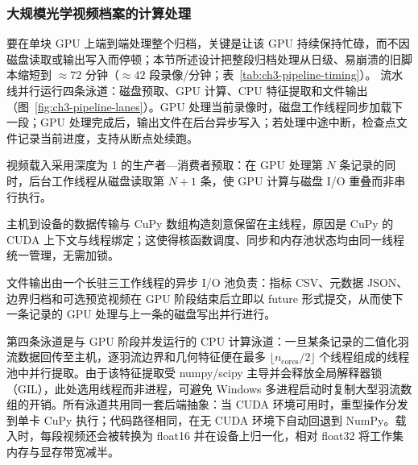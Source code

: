 \subsubsection{大规模光学视频档案的计算处理}\label{subsec:concurrency-architecture}

要在单块 GPU 上端到端处理整个归档，关键是让该 GPU 持续保持忙碌，而不因磁盘读取或输出写入而停顿；本节所述设计把整段归档处理从日级、易崩溃的旧脚本缩短到 ${\approx}72$ 分钟（${\approx}42$ 段录像/分钟；表~\ref{tab:ch3-pipeline-timing}）。
流水线并行运行四条泳道：磁盘预取、GPU 计算、CPU 特征提取和文件输出（图~\ref{fig:ch3-pipeline-lanes}）。GPU 处理当前录像时，磁盘工作线程同步加载下一段；GPU 处理完成后，输出文件在后台异步写入；若处理中途中断，检查点文件记录当前进度，支持从断点处续跑。

视频载入采用深度为 1 的生产者—消费者预取：在 GPU 处理第 $N$ 条记录的同时，后台工作线程从磁盘读取第 $N+1$ 条，使 GPU 计算与磁盘 I/O 重叠而非串行执行。

主机到设备的数据传输与 CuPy 数组构造刻意保留在主线程，原因是 CuPy 的 CUDA 上下文与线程绑定；这使得核函数调度、同步和内存池状态均由同一线程统一管理，无需加锁。

文件输出由一个长驻三工作线程的异步 I/O 池负责：指标 CSV、元数据 JSON、边界归档和可选预览视频在 GPU 阶段结束后立即以 future 形式提交，从而使下一条记录的 GPU 处理与上一条的磁盘写出并行进行。

第四条泳道是与 GPU 阶段并发运行的 CPU 计算泳道：一旦某条记录的二值化羽流数据回传至主机，逐羽流边界和几何特征便在最多 $\lfloor n_{\mathrm{cores}}/2\rfloor$ 个线程组成的线程池中并行提取。由于该特征提取受 numpy/scipy 主导并会释放全局解释器锁（GIL），此处选用线程而非进程，可避免 Windows 多进程启动时复制大型羽流数组的开销。所有泳道共用同一套后端抽象：当 CUDA 环境可用时，重型操作分发到单卡 CuPy 执行；代码路径相同，在无 CUDA 环境下自动回退到 NumPy。载入时，每段视频还会被转换为 float16 并在设备上归一化，相对 float32 将工作集内存与显存带宽减半。

